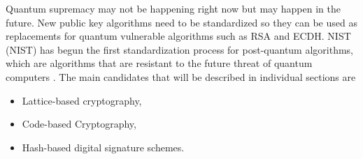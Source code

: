 Quantum supremacy may not be happening right now but may happen in the future. New public key algorithms need to be standardized so they can be used as replacements for quantum vulnerable algorithms such as RSA and ECDH. NIST (\acl{NIST}) has begun the first standardization process for post-quantum algorithms, which are algorithms that are resistant to the future threat of quantum computers \cite{Chen2016}. The main candidates that will be described  in individual sections are
\begin{itemize}
  \item Lattice-based cryptography,
  \item Code-based Cryptography,
  \item Hash-based digital signature schemes.
\end{itemize}
